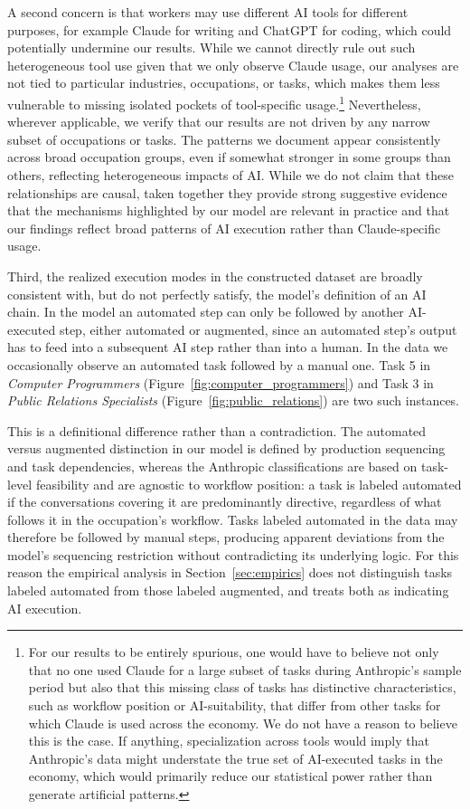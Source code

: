 A second concern is that workers may use different AI tools for different purposes, for example Claude for writing and ChatGPT for coding, which could potentially undermine our results.
While we cannot directly rule out such heterogeneous tool use given that we only observe Claude usage, our analyses are not tied to particular industries, occupations, or tasks, which makes them less vulnerable to missing isolated pockets of tool-specific usage.\footnote{
For our results to be entirely spurious, one would have to believe not only that no one used Claude for a large subset of tasks during Anthropic's sample period but also that this missing class of tasks has distinctive characteristics, such as workflow position or AI-suitability, that differ from other tasks for which Claude is used across the economy.
We do not have a reason to believe this is the case.
If anything, specialization across tools would imply that Anthropic's data might understate the true set of AI-executed tasks in the economy, which would primarily reduce our statistical power rather than generate artificial patterns.
}
Nevertheless, wherever applicable, we verify that our results are not driven by any narrow subset of occupations or tasks.
The patterns we document appear consistently across broad occupation groups, even if somewhat stronger in some groups than others, reflecting heterogeneous impacts of AI.
While we do not claim that these relationships are causal, taken together they provide strong suggestive evidence that the mechanisms highlighted by our model are relevant in practice and that our findings reflect broad patterns of AI execution rather than Claude-specific usage.

Third, the realized execution modes in the constructed dataset are broadly consistent with, but do not perfectly satisfy, the model's definition of an AI chain.
In the model an automated step can only be followed by another AI-executed step, either automated or augmented, since an automated step's output has to feed into a subsequent AI step rather than into a human.
In the data we occasionally observe an automated task followed by a manual one.
Task 5 in \textit{Computer Programmers} (Figure~\ref{fig:computer_programmers}) and Task 3 in \textit{Public Relations Specialists} (Figure~\ref{fig:public_relations}) are two such instances.

This is a definitional difference rather than a contradiction.
The automated versus augmented distinction in our model is defined by production sequencing and task dependencies, whereas the Anthropic classifications are based on task-level feasibility and are agnostic to workflow position: a task is labeled automated if the conversations covering it are predominantly directive, regardless of what follows it in the occupation's workflow.
Tasks labeled automated in the data may therefore be followed by manual steps, producing apparent deviations from the model's sequencing restriction without contradicting its underlying logic.
For this reason the empirical analysis in Section~\ref{sec:empirics} does not distinguish tasks labeled automated from those labeled augmented, and treats both as indicating AI execution.



